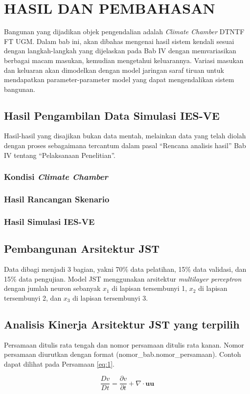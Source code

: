 \chapter{HASIL DAN PEMBAHASAN}
\label{hasil-dan-pembahasan}
Bangunan yang dijadikan objek pengendalian adalah \textit{Climate Chamber} DTNTF FT UGM. Dalam bab ini, akan dibahas mengenai hasil sistem kendali sesuai dengan langkah-langkah yang dijelaskan pada Bab IV dengan memvariasikan berbagai macam masukan, kemudian mengetahui keluarannya. Variasi masukan dan keluaran akan dimodelkan dengan model jaringan saraf tiruan untuk mendapatkan parameter-parameter model yang dapat mengendalikan sistem bangunan.

\section{Hasil Pengambilan Data Simulasi IES-VE}
Hasil-hasil yang disajikan bukan data mentah, melainkan data yang telah diolah dengan proses sebagaimana tercantum dalam pasal ``Rencana analisis hasil'' Bab IV tentang ``Pelaksanaan Penelitian''.
\subsection{Kondisi \textit{Climate Chamber}}
\subsection{Hasil Rancangan Skenario}
\subsection{Hasil Simulasi IES-VE}

\section{Pembangunan Arsitektur JST}
Data dibagi menjadi 3 bagian, yakni 70\% data pelatihan, 15\% data validasi, dan 15\% data pengujian. Model JST menggunakan arsitektur \textit{multilayer perceptron} dengan jumlah neuron sebanyak $x_1$ di lapisan tersembunyi 1, $x_2$ di lapisan tersembunyi 2, dan $x_3$ di lapisan tersembunyi 3.

\section{Analisis Kinerja Arsitektur JST yang terpilih}

Persamaan ditulis rata tengah dan nomor persamaan ditulis rata kanan. Nomor persamaan
diurutkan dengan format (nomor\_bab.nomor\_persamaan). Contoh dapat dilihat pada Persamaan \eqref{eq:1}.

\begin{equation}
    \dfrac{Dv}{Dt} = \dfrac{\partial v}{\partial t} + \nabla \cdot \mathbf{uu}
\label{eq:1}
\end{equation}

